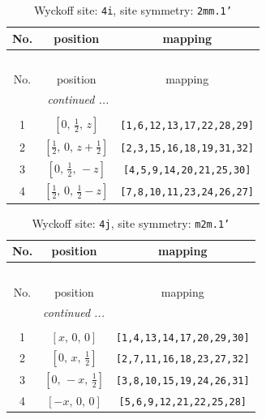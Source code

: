 \documentclass[fleqn,8pt]{jsarticle}
\begin{document}
\renewcommand{\arraystretch}{1.2}
\begin{longtable}{ccc}
\caption{Wyckoff site: {\tt 4i}, site symmetry: {\tt 2mm.1'}}
 \\
 \hline \hline
No. & position & mapping \\ \hline \endfirsthead

\multicolumn{2}{l}{\tablename\ \thetable{}} \\
 \hline \hline
No. & position & mapping \\ \hline \endhead

 \hline \hline
\multicolumn{2}{r}{\footnotesize\it continued ...} \\ \endfoot

 \hline \hline
\multicolumn{2}{r}{} \\ \endlastfoot

1 & $\left[ 0,\, \frac{1}{2},\, z \right]$ & {\tt [1,6,12,13,17,22,28,29]} \\ \hline
2 & $\left[ \frac{1}{2},\, 0,\, z + \frac{1}{2} \right]$ & {\tt [2,3,15,16,18,19,31,32]} \\ \hline
3 & $\left[ 0,\, \frac{1}{2},\, - z \right]$ & {\tt [4,5,9,14,20,21,25,30]} \\ \hline
4 & $\left[ \frac{1}{2},\, 0,\, \frac{1}{2} - z \right]$ & {\tt [7,8,10,11,23,24,26,27]} \\
\end{longtable}
\renewcommand{\arraystretch}{1.2}
\begin{longtable}{ccc}
\caption{Wyckoff site: {\tt 4j}, site symmetry: {\tt m2m.1'}}
 \\
 \hline \hline
No. & position & mapping \\ \hline \endfirsthead

\multicolumn{2}{l}{\tablename\ \thetable{}} \\
 \hline \hline
No. & position & mapping \\ \hline \endhead

 \hline \hline
\multicolumn{2}{r}{\footnotesize\it continued ...} \\ \endfoot

 \hline \hline
\multicolumn{2}{r}{} \\ \endlastfoot

1 & $\left[ x,\, 0,\, 0 \right]$ & {\tt [1,4,13,14,17,20,29,30]} \\ \hline
2 & $\left[ 0,\, x,\, \frac{1}{2} \right]$ & {\tt [2,7,11,16,18,23,27,32]} \\ \hline
3 & $\left[ 0,\, - x,\, \frac{1}{2} \right]$ & {\tt [3,8,10,15,19,24,26,31]} \\ \hline
4 & $\left[ - x,\, 0,\, 0 \right]$ & {\tt [5,6,9,12,21,22,25,28]} \\
\end{longtable}
\end{document}
